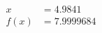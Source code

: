 \documentclass[preview]{standalone}
\begin{document}
\begin{align*}
x &= 4.9841\\f(x) &= 7.9999684
\end{align*}
\end{document}
